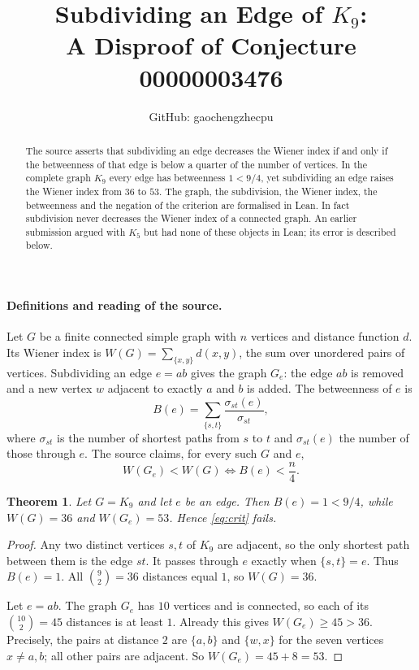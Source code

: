 \documentclass[11pt]{article}
\title{Subdividing an Edge of $K_9$:\\A Disproof of Conjecture 00000003476}
\author{GitHub: gaochengzhecpu}
\date{}
\newtheorem{theorem}{Theorem}
\theoremstyle{remark}
\begin{document}
\maketitle
\begin{abstract}
The source asserts that subdividing an edge decreases the Wiener index
if and only if the betweenness of that edge is below a quarter of the
number of vertices. In the complete graph $K_9$ every edge has
betweenness $1<9/4$, yet subdividing an edge raises the Wiener index
from $36$ to $53$. The graph, the subdivision, the Wiener index, the
betweenness and the negation of the criterion are formalised in Lean.
In fact subdivision never decreases the Wiener index of a connected
graph. An earlier submission argued with $K_5$ but had none of these
objects in Lean; its error is described below.
\end{abstract}

\paragraph{Definitions and reading of the source.}
Let $G$ be a finite connected simple graph with $n$ vertices and
distance function $d$. Its Wiener index is
$W(G)=\sum_{\{x,y\}}d(x,y)$, the sum over unordered pairs of vertices.
Subdividing an edge $e=ab$ gives the graph $G_e$: the edge $ab$ is
removed and a new vertex $w$ adjacent to exactly $a$ and $b$ is added.
The betweenness of $e$ is
\[
 B(e)=\sum_{\{s,t\}}\frac{\sigma_{st}(e)}{\sigma_{st}},
\]
where $\sigma_{st}$ is the number of shortest paths from $s$ to $t$ and
$\sigma_{st}(e)$ the number of those through $e$. The source claims, for
every such $G$ and $e$,
\begin{equation}\label{eq:crit}
 W(G_e)<W(G)\iff B(e)<\frac n4 .
\end{equation}

\begin{theorem}
Let $G=K_9$ and let $e$ be an edge. Then $B(e)=1<9/4$, while
$W(G)=36$ and $W(G_e)=53$. Hence \eqref{eq:crit} fails.
\end{theorem}
\begin{proof}
Any two distinct vertices $s,t$ of $K_9$ are adjacent, so the only
shortest path between them is the edge $st$. It passes through $e$
exactly when $\{s,t\}=e$. Thus $B(e)=1$. All $\binom92=36$ distances
equal $1$, so $W(G)=36$.

Let $e=ab$. The graph $G_e$ has $10$ vertices and is connected, so each
of its $\binom{10}2=45$ distances is at least $1$. Already this gives
$W(G_e)\ge45>36$. Precisely, the pairs at distance $2$ are $\{a,b\}$ and
$\{w,x\}$ for the seven vertices $x\ne a,b$; all other pairs are
adjacent. So $W(G_e)=45+8=53$.
\end{proof}
\end{document}
